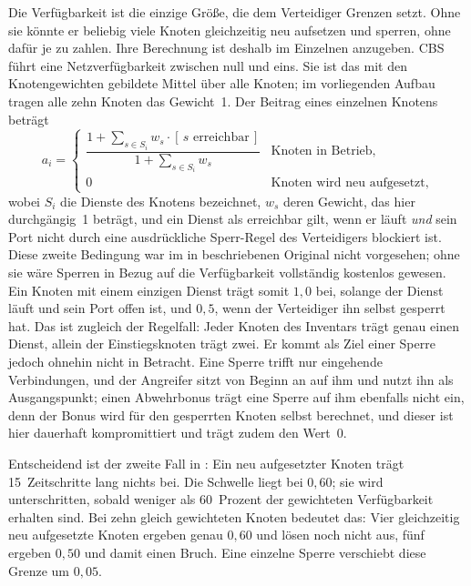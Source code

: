 Die Verfügbarkeit ist die einzige Größe, die dem Verteidiger Grenzen setzt.
Ohne sie könnte er beliebig viele Knoten gleichzeitig neu aufsetzen und
sperren, ohne dafür je zu zahlen. Ihre Berechnung ist deshalb im Einzelnen
anzugeben. \ac{CBS} führt eine Netzverfügbarkeit zwischen null und
eins. Sie ist das mit den Knotengewichten gebildete Mittel über alle Knoten;
im vorliegenden Aufbau tragen alle zehn Knoten das Gewicht~1. Der Beitrag
eines einzelnen Knotens beträgt
%
\begin{equation}
  a_i =
  \begin{cases}
    \dfrac{1 + \sum_{s \in S_i} w_s \cdot [\,s \text{ erreichbar}\,]}
          {1 + \sum_{s \in S_i} w_s} & \text{Knoten in Betrieb,} \\[2ex]
    0 & \text{Knoten wird neu aufgesetzt,}
  \end{cases}
  \label{eq:verfuegbarkeit}
\end{equation}
%
wobei $S_i$ die Dienste des Knotens bezeichnet, $w_s$ deren Gewicht, das hier
durchgängig~1 beträgt, und ein Dienst als erreichbar gilt, wenn er läuft
\emph{und} sein Port nicht durch eine ausdrückliche Sperr-Regel des
Verteidigers blockiert ist. Diese zweite Bedingung war im in
 beschriebenen Original nicht vorgesehen; ohne sie
wäre Sperren in Bezug auf die Verfügbarkeit vollständig kostenlos gewesen. Ein
Knoten mit einem einzigen Dienst trägt somit $1{,}0$ bei, solange der Dienst
läuft und sein Port offen ist, und $0{,}5$, wenn der Verteidiger ihn selbst
gesperrt hat. Das ist zugleich der Regelfall: Jeder Knoten des Inventars trägt
genau einen Dienst, allein der Einstiegsknoten trägt zwei. Er kommt als Ziel
einer Sperre jedoch ohnehin nicht in Betracht. Eine Sperre trifft nur
eingehende Verbindungen, und der Angreifer sitzt von Beginn an auf ihm und
nutzt ihn als Ausgangspunkt; einen Abwehrbonus trägt eine Sperre auf ihm
ebenfalls nicht ein, denn der Bonus wird für den gesperrten Knoten selbst
berechnet, und dieser ist hier dauerhaft kompromittiert und trägt zudem den
Wert~0.

Entscheidend ist der zweite Fall in : Ein neu
aufgesetzter Knoten trägt \num{15}~Zeitschritte lang nichts bei. Die Schwelle
liegt bei $0{,}60$; sie wird unterschritten, sobald weniger als 60~Prozent der
gewichteten Verfügbarkeit erhalten sind. Bei zehn gleich gewichteten Knoten
bedeutet das: Vier gleichzeitig neu aufgesetzte Knoten ergeben genau $0{,}60$
und lösen noch nicht aus, fünf ergeben $0{,}50$ und damit einen Bruch. Eine
einzelne Sperre verschiebt diese Grenze um $0{,}05$.

